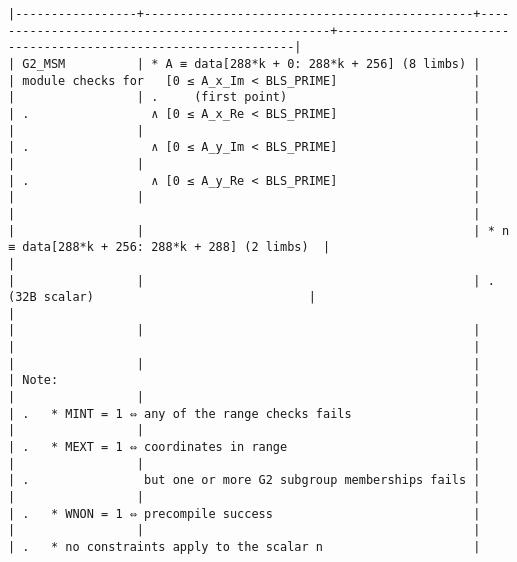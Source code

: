 \documentclass[varwidth=\maxdimen,margin=0.5cm,multi={verbatim}]{standalone}
\begin{document}
\begin{verbatim}
|-----------------+----------------------------------------------+-------------------------------------------------+----------------------------------------------------------------|
| G2_MSM          | * A ≡ data[288*k + 0: 288*k + 256] (8 limbs) |                                                 | module checks for   [0 ≤ A_x_Im < BLS_PRIME]                   |
|                 | .     (first point)                          |                                                 | .                 ∧ [0 ≤ A_x_Re < BLS_PRIME]                   |
|                 |                                              |                                                 | .                 ∧ [0 ≤ A_y_Im < BLS_PRIME]                   |
|                 |                                              |                                                 | .                 ∧ [0 ≤ A_y_Re < BLS_PRIME]                   |
|                 |                                              |                                                 |                                                                |
|                 |                                              | * n ≡ data[288*k + 256: 288*k + 288] (2 limbs)  |                                                                |
|                 |                                              | .     (32B scalar)                              |                                                                |
|                 |                                              |                                                 |                                                                |
|                 |                                              |                                                 | Note:                                                          |
|                 |                                              |                                                 | .   * MINT = 1 ⇔ any of the range checks fails                 |
|                 |                                              |                                                 | .   * MEXT = 1 ⇔ coordinates in range                          |
|                 |                                              |                                                 | .                but one or more G2 subgroup memberships fails |
|                 |                                              |                                                 | .   * WNON = 1 ⇔ precompile success                            |
|                 |                                              |                                                 | .   * no constraints apply to the scalar n                     |

\end{verbatim}
\end{document}
